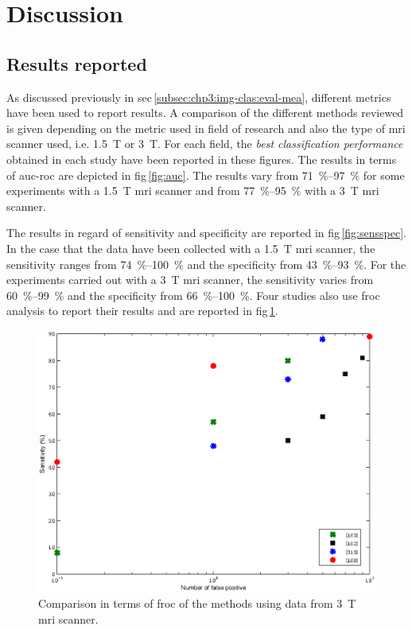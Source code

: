 \section{Discussion}\label{sec:chp3:dis}

\subsection{Results reported}\label{subsec:chp3:dis:res}

As discussed previously in \ac{sec}\,\ref{subsec:chp3:img-clas:eval-mea},
different metrics have been used to report results.
A comparison of the different methods reviewed is given depending on the metric
used in field of research and also the type of \ac{mri} scanner used,
i.e. \SI{1.5}{\tesla} or \SI{3}{\tesla}.
For each field, the \textit{best classification performance} obtained in each
study have been reported in these figures.
The results in terms of \ac{auc}-\ac{roc} are depicted in
\acs{fig}\,\ref{fig:auc}.
The results vary from \SIrange{71}{97}{\percent} for some experiments with a
\SI{1.5}{\tesla} \ac{mri} scanner and from \SIrange{77}{95}{\percent} with a
\SI{3}{\tesla} \ac{mri} scanner.

The results in regard of sensitivity and specificity are reported in
\acs{fig}\,\ref{fig:sensspec}.
In the case that the data have been collected with a \SI{1.5}{\tesla} \ac{mri}
scanner, the sensitivity ranges from \SIrange{74}{100}{\percent} and the
specificity from \SIrange{43}{93}{\percent}.
For the experiments carried out with a \SI{3}{\tesla} \ac{mri} scanner, the
sensitivity varies from \SIrange{60}{99}{\percent} and the specificity from
\SIrange{66}{100}{\percent}.
Four studies also use \ac{froc} analysis to report their results and are
reported in \ac{fig}\,\ref{fig:froc}.

\begin{figure}
  \centering
  \includegraphics[width=.8\linewidth]{3_review/figures/results/froc.eps}
  \caption{Comparison in terms of \acs*{froc} of the methods using data from
    \SI{3}{\tesla} \acs*{mri} scanner.}
  \label{fig:froc}
\end{figure}

